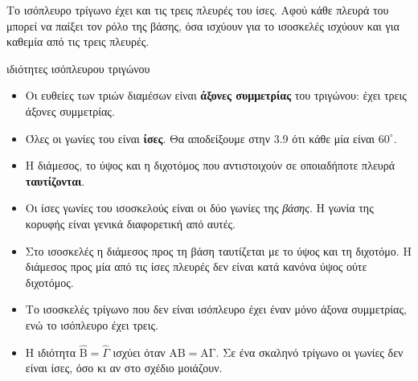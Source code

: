 
Το ισόπλευρο τρίγωνο έχει και τις τρεις πλευρές του ίσες. Αφού κάθε πλευρά του μπορεί να παίξει τον ρόλο της βάσης, όσα ισχύουν για το ισοσκελές ισχύουν και για καθεμία από τις τρεις πλευρές.

\begin{center}
\end{center}

\begin{kanonas}{ιδιότητες ισόπλευρου τριγώνου}
\begin{itemize}[leftmargin=1.2em,itemsep=0.3ex,topsep=2pt]
\item Οι ευθείες των τριών διαμέσων είναι \textbf{άξονες συμμετρίας} του τριγώνου: έχει τρεις άξονες συμμετρίας.
\item Όλες οι γωνίες του είναι \textbf{ίσες}. Θα αποδείξουμε στην 3.9 ότι κάθε μία είναι $60^\circ$.
\item Η διάμεσος, το ύψος και η διχοτόμος που αντιστοιχούν σε οποιαδήποτε πλευρά \textbf{ταυτίζονται}.
\end{itemize}
\end{kanonas}

\begin{prosoxi}
\begin{itemize}[leftmargin=1.2em,itemsep=0.3ex,topsep=2pt]
\item Οι ίσες γωνίες του ισοσκελούς είναι οι δύο γωνίες της \emph{βάσης}. Η γωνία της κορυφής είναι γενικά διαφορετική από αυτές.
\item Στο ισοσκελές η διάμεσος προς τη βάση ταυτίζεται με το ύψος και τη διχοτόμο. Η διάμεσος προς μία από τις ίσες πλευρές δεν είναι κατά κανόνα ύψος ούτε διχοτόμος.
\item Το ισοσκελές τρίγωνο που δεν είναι ισόπλευρο έχει έναν μόνο άξονα συμμετρίας, ενώ το ισόπλευρο έχει τρεις.
\item Η ιδιότητα $\hat{\mathrm{Β}}=\hat{\Gamma}$ ισχύει όταν $\mathrm{ΑΒ}=\mathrm{ΑΓ}$. Σε ένα σκαληνό τρίγωνο οι γωνίες δεν είναι ίσες, όσο κι αν στο σχέδιο μοιάζουν.
\end{itemize}
\end{prosoxi}

